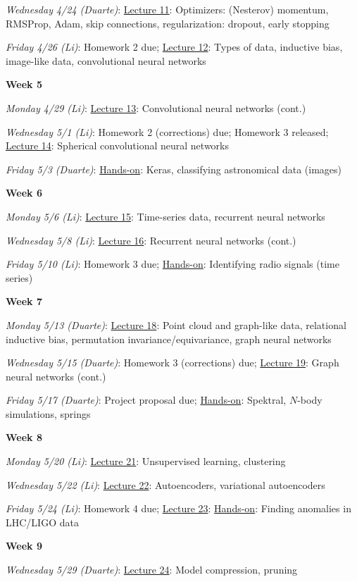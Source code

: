 \documentclass[12pt]{article}
\begin{document}
\emph{Wednesday 4/24 (Duarte)}: \underline{Lecture 11}: Optimizers: (Nesterov) momentum, RMSProp, Adam, skip connections, regularization: dropout, early stopping

\emph{Friday 4/26 (Li)}: Homework 2 due; \underline{Lecture 12}: Types of data, inductive bias, image-like data, convolutional neural networks

\noindent\textbf{Week 5}

\emph{Monday 4/29 (Li)}: \underline{Lecture 13}: Convolutional neural networks (cont.)

\emph{Wednesday 5/1 (Li)}: Homework 2 (corrections) due; Homework 3 released; \underline{Lecture 14}: Spherical convolutional neural networks

\emph{Friday 5/3 (Duarte)}: \underline{Hands-on}: Keras, classifying astronomical data (images)

\noindent\textbf{Week 6}

\emph{Monday 5/6 (Li)}: \underline{Lecture 15}: Time-series data, recurrent neural networks

\emph{Wednesday 5/8 (Li)}: \underline{Lecture 16}: Recurrent neural networks (cont.)

\emph{Friday 5/10 (Li)}: Homework 3 due; \underline{Hands-on}: Identifying radio signals (time series)

\noindent\textbf{Week 7}

\emph{Monday 5/13 (Duarte)}: \underline{Lecture 18}: Point cloud and graph-like data, relational inductive bias, permutation invariance/equivariance, graph neural networks

\emph{Wednesday 5/15 (Duarte)}: Homework 3 (corrections) due; \underline{Lecture 19}: Graph neural networks (cont.)

\emph{Friday 5/17 (Duarte)}: Project proposal due; \underline{Hands-on}: Spektral, $N$-body simulations, springs

\noindent\textbf{Week 8}

\emph{Monday 5/20 (Li)}: \underline{Lecture 21}: Unsupervised learning, clustering

\emph{Wednesday 5/22 (Li)}: \underline{Lecture 22}: Autoencoders, variational autoencoders

\emph{Friday 5/24 (Li)}: Homework 4 due; \underline{Lecture 23}: \underline{Hands-on}: Finding anomalies in LHC/LIGO data

\noindent\textbf{Week 9}

\emph{Wednesday 5/29 (Duarte)}: \underline{Lecture 24}: Model compression, pruning
\end{document}
